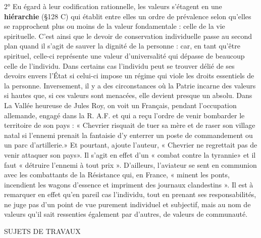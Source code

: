 2° Eu égard à leur codification rationnelle, les valeurs s’étagent en
une {\bf hiérarchie} (\S 128 C) qui établit entre elles un ordre de prévalence
selon qu’elles se rapprochent plus ou moins de la valeur fondamentale :
celle de la vie spirituelle. C’est ainsi que le devoir de conservation
individuelle passe au second plan quand il s’agit de sauver la dignité
de la personne : car, en tant qu'être spirituel, celle-ci représente une
valeur d’universalité qui dépasse de beaucoup celle de l'individu.
Dans certains cas l’individu peut se trouver délié de ses devoirs envers
l’État si celui-ci impose un régime qui viole les droits essentiels de la
personne. Inversement, il y a des circonstances où la Patrie incarne
des valeurs si hautes que, si ces valeurs sont menacées, elle devient
presque un absolu. Dans La Vallée heureuse de Jules Roy, on voit un
Français, pendant l'occupation allemande, engagé dans la R. A.F.
et qui a reçu l’ordre de venir bombarder le territoire de son pays :
« Chevrier risquait de tuer sa mère et de raser son village natal si
l’ennemi prenait la fantaisie d’y enterrer un poste de commandement
ou un parc d'artillerie.» Et pourtant, ajoute l’auteur, « Chevrier ne
regrettait pas de venir attaquer son pays». Il s’agit en effet d’un
« combat contre la tyrannie» et il faut « détruire l’ennemi à tout prix ».
D'ailleurs, l’aviateur se sent en communion avec les combattants de
la Résistance qui, en France, « minent les ponts, incendient les wagons
d’essence et impriment des journaux clandestins ». Il est à remarquer
en effet qu’en pareil cas l'individu, tout en prenant ses responsabilités,
ne juge pas d’un point de vue purement individuel et subjectif,
mais au nom de valeurs qu’il sait ressenties également par d’autres,
de valeurs de communauté.

SUJETS DE TRAVAUX


